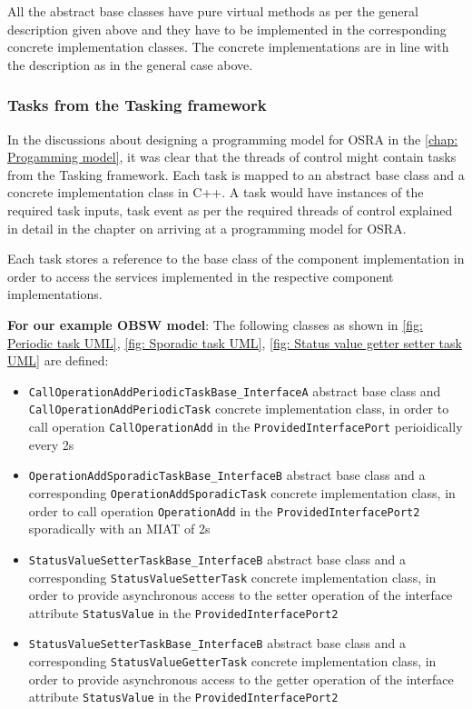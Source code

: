 All the abstract base classes have pure virtual methods as per the general description given above and they have to be implemented in the corresponding concrete implementation classes. The concrete implementations are in line with the description as in the general case above.

\subsubsection{\textbf{Tasks from the Tasking framework}}
In the discussions about designing a programming model for OSRA in the \cref{chap: Progamming model}, it was clear that the threads of control might contain tasks from the Tasking framework. Each task is mapped to an abstract base class and a concrete implementation class in C++. A task would have instances of the required task inputs, task event as per the required threads of control explained in detail in the chapter on arriving at a programming model for OSRA.

Each task stores a reference to the base class of the component implementation in order to access the services implemented in the respective component implementations.  

\textbf{For our example OBSW model}: The following classes as shown in \cref{fig: Periodic task UML}, \cref{fig: Sporadic task UML}, \cref{fig: Status value getter setter task UML} are defined:
\begin{itemize}
\item \texttt{CallOperationAdd\allowbreak Periodic\allowbreak TaskBase\allowbreak \_InterfaceA} abstract base class and \texttt{Call\allowbreak OperationAdd\allowbreak Periodic\allowbreak Task} concrete implementation class, in order to call operation \texttt{Call\allowbreak OperationAdd} in the \texttt{Provided\allowbreak Interface\allowbreak Port} perioidically every 2s
\item \texttt{OperationAdd\allowbreak Sporadic\allowbreak TaskBase\allowbreak \_InterfaceB} abstract base class and a corresponding \texttt{Operation\allowbreak Add\allowbreak Sporadic\allowbreak Task} concrete implementation class, in order to call operation \texttt{Operation\allowbreak Add} in the \texttt{Provided\allowbreak Interface\allowbreak Port2} sporadically with an MIAT of 2s
\item \texttt{StatusValue\allowbreak SetterTaskBase\allowbreak \_InterfaceB} abstract base class and a corresponding \texttt{Status\allowbreak Value\allowbreak Setter\allowbreak Task} concrete implementation class, in order to provide asynchronous access to the setter operation of the interface attribute \texttt{Status\allowbreak Value} in the \texttt{Provided\allowbreak Interface\allowbreak Port2}
\item \texttt{StatusValue\allowbreak SetterTaskBase\allowbreak \_InterfaceB} abstract base class and a corresponding \texttt{Status\allowbreak Value\allowbreak Getter\allowbreak Task} concrete implementation class, in order to provide asynchronous access to the getter operation of the interface attribute \texttt{Status\allowbreak Value} in the \texttt{Provided\allowbreak Interface\allowbreak Port2}
\end{itemize} 

